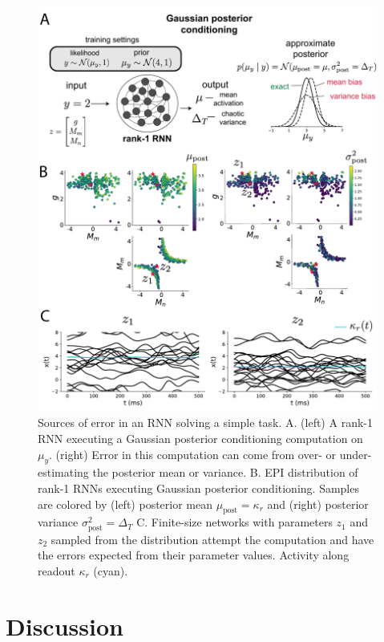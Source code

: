 \documentclass[11pt]{article}
\begin{document}
\begin{figure}
\begin{center}
\includegraphics[scale=0.7]{figures/fig5/fig5.pdf}
\end{center}
\caption{Sources of error in an RNN solving a simple task.  A. (left) A rank-1 RNN executing a Gaussian posterior conditioning computation on $\mu_y$. (right) Error in this computation can come from over- or under-estimating the posterior mean or variance. B. EPI distribution of rank-1 RNNs executing Gaussian posterior conditioning.  Samples are colored by (left) posterior mean $\mu_{\text{post}}=\kappa_r$ and (right) posterior variance $\sigma^2_{\text{post}}=\Delta_T$  C.  Finite-size networks with parameters $z_1$ and $z_2$ sampled from the distribution attempt the computation and have the errors expected from their parameter values.  Activity along readout $\kappa_r$ (cyan).}
\end{figure}

\section{Discussion}
\end{document}

